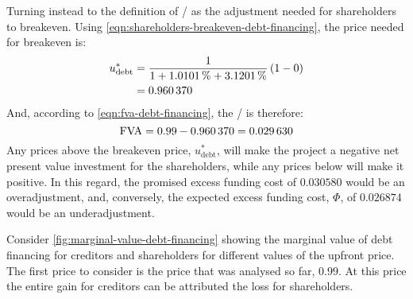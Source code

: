 \documentclass[main.tex]{subfiles}
\begin{document}
        Turning instead to the definition of \FVA/ as the adjustment needed for shareholders to breakeven.
        Using \cref{eqn:shareholders-breakeven-debt-financing}, the price needed for breakeven is:
            \begin{align}
                    u^{\ast}_{\text{debt}} 
                &=
                    \frac{
                        \num{1}
                    }{
                        \num{1} + \pct{0.010101} + \pct{0.031201}
                    }
                    \left(
                        \num{1}
                        -
                        \num{0}
                    \right)
                \nonumber \\
                &=
                    \num{0.960370}
            \end{align}
        And, according to \cref{eqn:fva-debt-financing}, the \FVA/ is therefore:
            \begin{equation}
                    \FVA/ 
                =
                    \num{0.99} - \num{0.960370}
                =
                    \num{0.029630}
            \end{equation}
        Any prices above the breakeven price, $u^{\ast}_{\text{debt}}$, 
        will make the project a negative net present value investment for the shareholders, while any prices below will make it positive. 
        In this regard, the promised excess funding cost of $\num{0.030580}$ would be an overadjustment,
        and, conversely, the expected excess funding cost, $\Phi$, of $\num{0.026874}$ would be an underadjustment.
        
        Consider \cref{fig:marginal-value-debt-financing} showing the marginal value 
        of debt financing for creditors and shareholders for different values of the upfront price.
        The first price to consider is the price that was analysed so far, $\num{0.99}$.
        At this price the entire gain for creditors can be attributed the loss for shareholders.
\end{document}
